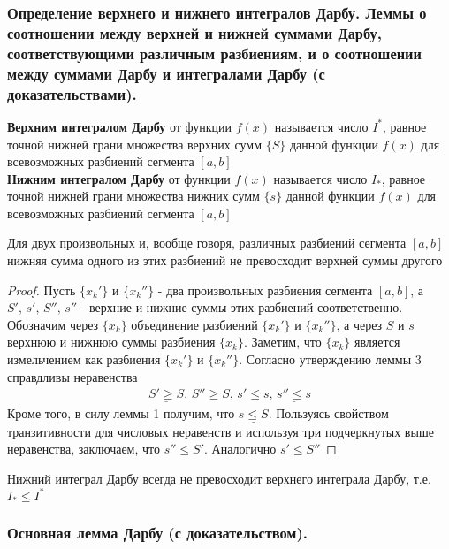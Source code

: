 \documentclass[10pt]{article}
\begin{document}
    \subsubsection{Определение верхнего и нижнего интегралов Дарбу. Леммы о соотношении между верхней и нижней суммами Дарбу, соответствующими различным разбиениям, и о соотношении между суммами Дарбу и интегралами Дарбу (с доказательствами).}
    \begin{definition}
        \textbf{Верхним интегралом Дарбу} от функции $f(x)$ называется число $I^*$, равное точной нижней грани множества верхних сумм $\{S\}$ данной функции $f(x)$ для всевозможных разбиений сегмента $[a, b]$\\
        \textbf{Нижним интегралом Дарбу} от функции $f(x)$ называется число $I_*$, равное точной нижней грани множества нижних сумм $\{s\}$ данной функции $f(x)$ для всевозможных разбиений сегмента $[a, b]$\\
    \end{definition}
    \begin{lemma}
        Для двух произвольных и, вообще говоря, различных разбиений сегмента $[a, b]$ нижняя сумма одного из этих разбиений не превосходит верхней суммы другого
    \end{lemma}
    \begin{proof}
        Пусть $\{x_k'\}$ и $\{x_k''\}$ - два произвольных разбиения сегмента $[a, b]$, а $S',\,s',\,S'',\,s''$ - верхние и нижние суммы этих разбиений соответственно. Обозначим через $\{x_k\}$ объединение разбиений $\{x_k'\}$ и $\{x_k''\}$, а через $S$ и $s$ верхнюю и нижнюю суммы разбиения $\{x_k\}$. Заметим, что $\{x_k\}$ является измельчением как разбиения $\{x_k'\}$ и $\{x_k''\}$. Согласно утверждению леммы 3 справдливы неравенства
        \begin{gather*}
            \underline{S' \geq  S},\, S'' \geq S,\, s' \leq s,\, \underline{s'' \leq s}
        \end{gather*}
        Кроме того, в силу леммы 1 получим, что $\underline{s \leq S}$. Пользуясь свойством транзитивности для числовых неравенств и используя три подчеркнутых выше неравенства, заключаем, что $s'' \leq S'$. Аналогично $s' \leq S''$
    \end{proof}
    \begin{lemma}
        Нижний интеграл Дарбу всегда не превосходит верхнего интеграла Дарбу, т.е. $I_* \leq I^*$
    \end{lemma}
    \subsubsection{Основная лемма Дарбу (с доказательством).}
\end{document}
